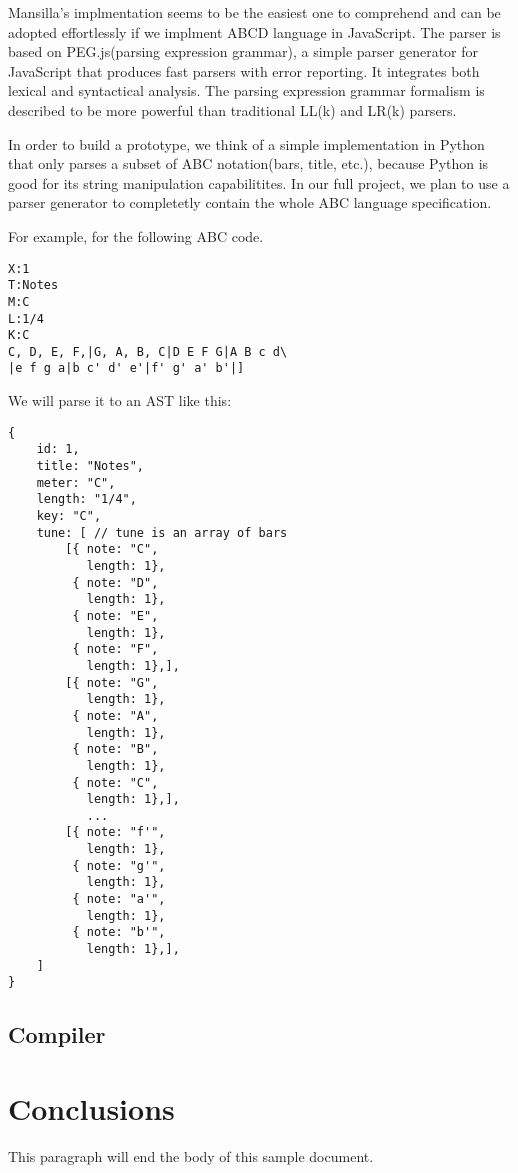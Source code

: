 Mansilla's implmentation seems to be the easiest one to comprehend and can be adopted effortlessly if we implment ABCD language in JavaScript. The parser is based on PEG.js(parsing expression grammar), a simple parser generator for JavaScript that produces fast parsers with error reporting\cite{Ryuu17}. It integrates both lexical and syntactical analysis. The parsing expression grammar formalism is described to be more powerful than traditional LL(k) and LR(k) parsers.

In order to build a prototype, we think of a simple implementation in Python that only parses a subset of ABC notation(bars, title, etc.), because Python is good for its string manipulation capabilitites. In our full project, we plan to use a parser generator to completetly contain the whole ABC language specification. 

For example, for the following ABC code.
\begin{verbatim}
X:1
T:Notes
M:C
L:1/4
K:C
C, D, E, F,|G, A, B, C|D E F G|A B c d\
|e f g a|b c' d' e'|f' g' a' b'|]
\end{verbatim}

We will parse it to an AST like this:
\begin{verbatim}
{
	id: 1,
	title: "Notes",
	meter: "C",
	length: "1/4",
	key: "C",
	tune: [ // tune is an array of bars
	    [{ note: "C",
	       length: 1},
	     { note: "D",
	       length: 1},
	     { note: "E",
	       length: 1},
	     { note: "F",
	       length: 1},],
	    [{ note: "G",
	       length: 1},
	     { note: "A",
	       length: 1},
	     { note: "B",
	       length: 1},
	     { note: "C",
	       length: 1},],
	       ...
	    [{ note: "f'",
	       length: 1},
	     { note: "g'",
	       length: 1},
	     { note: "a'",
	       length: 1},
	     { note: "b'",
	       length: 1},],
	]
}
\end{verbatim}

\subsection{Compiler}

\section{Conclusions}

This paragraph will end the body of this sample document.